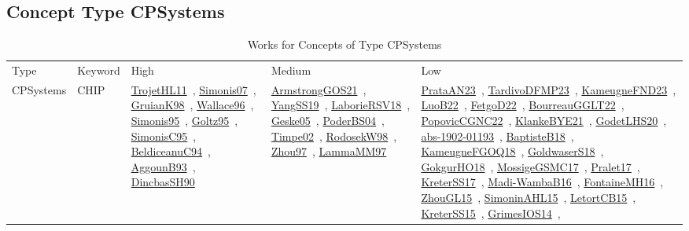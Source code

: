 \clearpage
\subsection{Concept Type CPSystems}
\label{sec:CPSystems}
{\scriptsize
\begin{longtable}{lp{3cm}>{\raggedright\arraybackslash}p{6cm}>{\raggedright\arraybackslash}p{6cm}>{\raggedright\arraybackslash}p{8cm}}
\rowcolor{white}\caption{Works for Concepts of Type CPSystems}\\ \toprule
\rowcolor{white}Type & Keyword & High & Medium & Low\\ \midrule\endhead
\bottomrule
\endfoot
CPSystems & CHIP & \href{works/TrojetHL11.pdf}{TrojetHL11}~\cite{TrojetHL11}, \href{works/Simonis07.pdf}{Simonis07}~\cite{Simonis07}, \href{works/GruianK98.pdf}{GruianK98}~\cite{GruianK98}, \href{works/Wallace96.pdf}{Wallace96}~\cite{Wallace96}, \href{works/Simonis95.pdf}{Simonis95}~\cite{Simonis95}, \href{works/Goltz95.pdf}{Goltz95}~\cite{Goltz95}, \href{works/SimonisC95.pdf}{SimonisC95}~\cite{SimonisC95}, \href{works/BeldiceanuC94.pdf}{BeldiceanuC94}~\cite{BeldiceanuC94}, \href{works/AggounB93.pdf}{AggounB93}~\cite{AggounB93}, \href{works/DincbasSH90.pdf}{DincbasSH90}~\cite{DincbasSH90} & \href{works/ArmstrongGOS21.pdf}{ArmstrongGOS21}~\cite{ArmstrongGOS21}, \href{works/YangSS19.pdf}{YangSS19}~\cite{YangSS19}, \href{works/LaborieRSV18.pdf}{LaborieRSV18}~\cite{LaborieRSV18}, \href{works/Geske05.pdf}{Geske05}~\cite{Geske05}, \href{works/PoderBS04.pdf}{PoderBS04}~\cite{PoderBS04}, \href{works/Timpe02.pdf}{Timpe02}~\cite{Timpe02}, \href{works/RodosekW98.pdf}{RodosekW98}~\cite{RodosekW98}, \href{works/Zhou97.pdf}{Zhou97}~\cite{Zhou97}, \href{works/LammaMM97.pdf}{LammaMM97}~\cite{LammaMM97} & \href{works/PrataAN23.pdf}{PrataAN23}~\cite{PrataAN23}, \href{works/TardivoDFMP23.pdf}{TardivoDFMP23}~\cite{TardivoDFMP23}, \href{works/KameugneFND23.pdf}{KameugneFND23}~\cite{KameugneFND23}, \href{works/LuoB22.pdf}{LuoB22}~\cite{LuoB22}, \href{works/FetgoD22.pdf}{FetgoD22}~\cite{FetgoD22}, \href{works/BourreauGGLT22.pdf}{BourreauGGLT22}~\cite{BourreauGGLT22}, \href{works/PopovicCGNC22.pdf}{PopovicCGNC22}~\cite{PopovicCGNC22}, \href{works/KlankeBYE21.pdf}{KlankeBYE21}~\cite{KlankeBYE21}, \href{works/GodetLHS20.pdf}{GodetLHS20}~\cite{GodetLHS20}, \href{works/abs-1902-01193.pdf}{abs-1902-01193}~\cite{abs-1902-01193}, \href{works/BaptisteB18.pdf}{BaptisteB18}~\cite{BaptisteB18}, \href{works/KameugneFGOQ18.pdf}{KameugneFGOQ18}~\cite{KameugneFGOQ18}, \href{works/GoldwaserS18.pdf}{GoldwaserS18}~\cite{GoldwaserS18}, \href{works/GokgurHO18.pdf}{GokgurHO18}~\cite{GokgurHO18}, \href{works/MossigeGSMC17.pdf}{MossigeGSMC17}~\cite{MossigeGSMC17}, \href{works/Pralet17.pdf}{Pralet17}~\cite{Pralet17}, \href{works/KreterSS17.pdf}{KreterSS17}~\cite{KreterSS17}, \href{works/Madi-WambaB16.pdf}{Madi-WambaB16}~\cite{Madi-WambaB16}, \href{works/FontaineMH16.pdf}{FontaineMH16}~\cite{FontaineMH16}, \href{works/ZhouGL15.pdf}{ZhouGL15}~\cite{ZhouGL15}, \href{works/SimoninAHL15.pdf}{SimoninAHL15}~\cite{SimoninAHL15}, \href{works/LetortCB15.pdf}{LetortCB15}~\cite{LetortCB15}, \href{works/KreterSS15.pdf}{KreterSS15}~\cite{KreterSS15}, \href{works/GrimesIOS14.pdf}{GrimesIOS14}~\cite{GrimesIOS14}, 
\end{longtable}}
